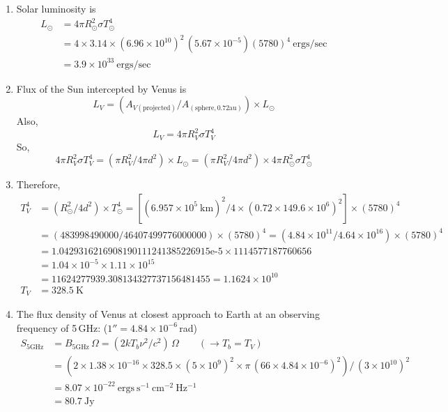 \begin{enumerate}
\item Solar luminosity is
  \begin{align*}
  L_\odot &= 4\pi R_\odot^2\sigma T_\odot^4\\
    &= 4\times3.14\times(6.96\times10^{10})^2\,(5.67\times10^{-5})(5780)^4~\mathrm{ergs/sec}\\
    &= 3.9\times10^{33}~\mathrm{ergs/sec} \tag*{(10)}
  \end{align*}
\item Flux of the Sun intercepted by Venus is
  \[
  L_V = \left(A_{V\mathrm{(projected)}}/A_{\mathrm{(sphere,0.72au)}}\right)\times L_\odot
  \]
  Also,
  \[
  L_V = 4\pi R_V^2\sigma T_V^4
  \]
  So,
  \[
  4\pi R_V^2\sigma T_V^4 = (\pi R_V^2/4\pi d^2)\times L_\odot
    = (\pi R_V^2/4\pi d^2)\times 4\pi R_\odot^2\sigma T_\odot^4 \tag*{(30)}
  \]
\item Therefore,
  \begin{align*}
  T_V^4 &= (R_\odot^2/4d^2)\times T_\odot^4
    = \left[(6.957\times10^5~\mathrm{km})^2/4\times(0.72\times149.6\times10^6)^2\right]\times(5780)^4\\
  &= (483998490000/46407499776000000)\times(5780)^4
    = (4.84\times10^{11}/4.64\times10^{16})\times(5780)^4\\
  &= 1.0429316216908190111241385226915\text{e-}5\times1114577187760656\\
  &= 1.04\times10^{-5}\times1.11\times10^{15}\\
  &= 11624277939.308134327737156481455 = 1.1624\times10^{10}\\
  T_V &= 328.5~\mathrm{K} \tag*{(20)}
  \end{align*}
\item The flux density of Venus at closest approach to Earth at an observing
  frequency of 5\,GHz: ($1'' = 4.84\times10^{-6}$\,rad)
  \begin{align*}
  S_{\mathrm{5GHz}} &= B_{\mathrm{5GHz}}\,\Omega = (2kT_b\nu^2/c^2)\,\Omega
    \qquad(\rightarrow T_b = T_V)\\
  &= \left(2\times1.38\times10^{-16}\times328.5\times(5\times10^9)^2
    \times\pi\,(66\times4.84\times10^{-6})^2\right)/\,(3\times10^{10})^2\\
  &= 8.07\times10^{-22}~\mathrm{ergs~s^{-1}~cm^{-2}~Hz^{-1}}\\
  &= 80.7~\mathrm{Jy} \tag*{(40)}
  \end{align*}
\end{enumerate}

